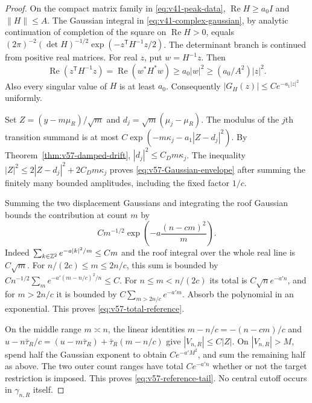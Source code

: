 \begin{proof}
On the compact matrix family in \eqref{eq:v41-peak-data},
$\operatorname{Re}H\ge a_0I$ and $\|H\|\le A$. The Gaussian integral
in \eqref{eq:v41-complex-gaussian}, by analytic continuation of
completion of the square on $\operatorname{Re}H>0$, equals
$(2\pi)^{-2}(\det H)^{-1/2}\exp(-z^{\mathsf T}H^{-1}z/2)$.
The determinant branch is continued from positive real matrices.
For real $z$, put $w=H^{-1}z$. Then
\[
 \operatorname{Re}(z^{\mathsf T}H^{-1}z)
   =\operatorname{Re}(w^*H^*w)\ge a_0|w|^2
                                      \ge (a_0/A^2)|z|^2.
\]
Also every singular value of $H$ is at least $a_0$. Consequently
$|G_H(z)|\le C e^{-a_1|z|^2}$ uniformly.

Set $Z=(y-m\mu_R)/\sqrt m$ and $d_j=\sqrt m(\mu_j-\mu_R)$.
The modulus of the $j$th transition summand is at most
$C\exp(-m\kappa_j-a_1|Z-d_j|^2)$. By
Theorem~\ref{thm:v57-damped-drift}, $|d_j|^2\le C_Dm\kappa_j$.
The inequality $|Z|^2\le2|Z-d_j|^2+2C_Dm\kappa_j$ proves
\eqref{eq:v57-Gaussian-envelope} after summing the finitely many
bounded amplitudes, including the fixed factor $1/c$.

Summing the two displacement Gaussians and integrating the roof
Gaussian bounds the contribution at count $m$ by
\begin{equation}\label{eq:v57-count-tail-sum}
       C m^{-1/2}\exp\left(-a\frac{(n-cm)^2}{m}\right).
\end{equation}
Indeed $\sum_{k\in\mathbb Z^2}e^{-a|k|^2/m}\le Cm$ and the roof
integral over the whole real line is $C\sqrt m$.
For $n/(2c)\le m\le2n/c$, this sum is bounded by
$C n^{-1/2}\sum_m e^{-a'(m-n/c)^2/n}\le C$.
For $n\le m<n/(2c)$ its total is $C\sqrt n e^{-a'n}$, and for
$m>2n/c$ it is bounded by $C\sum_{m>2n/c}e^{-a'm}$.
Absorb the polynomial in an exponential. This proves
\eqref{eq:v57-total-reference}.

On the middle range $m\asymp n$, the linear identities
$m-n/c=-(n-cm)/c$ and
$u-n\bar\tau_R/c=(u-m\bar\tau_R)+\bar\tau_R(m-n/c)$ give
$|V_{n,R}|\le C|Z|$. On $|V_{n,R}|>M$, spend half the Gaussian
exponent to obtain $Ce^{-a'M^2}$, and sum the remaining half as
above. The two outer count ranges have total $Ce^{-a'n}$ whether
or not the target restriction is imposed. This proves
\eqref{eq:v57-reference-tail}. No central cutoff occurs in
$\gamma_{n,R}$ itself.
\end{proof}

